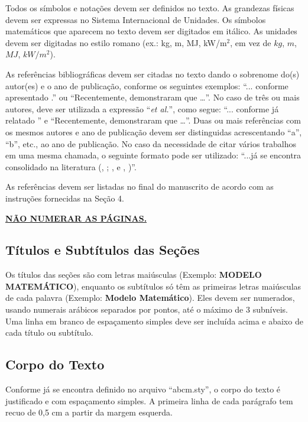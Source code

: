 \documentclass[10pt,fleqn,a4paper,twoside]{article}
\begin{document}
        Todos os símbolos e notações devem ser definidos no texto. As grandezas físicas devem ser expressas no Sistema Internacional de Unidades. Os símbolos matemáticos que aparecem no texto devem ser digitados em itálico. As unidades devem ser digitadas no estilo romano (ex.: kg, m, MJ, kW/m$^2$, em vez de $kg$, $m$, $MJ$, $kW/m^2$).
        
        As referências bibliográficas devem ser citadas no texto dando o sobrenome do(s) autor(es) e o ano de publicação, conforme os seguintes exemplos: ``... conforme apresentado \citep{MinwooShamim13}.'' ou ``Recentemente, \citet{MinwooShamim13} demonstraram que …''. No caso de três ou mais autores, deve ser utilizada a expressão ``\textit{et al.}'', como segue: ``... conforme já relatado \citep{Bordalo89}'' e ``Recentemente, \citet{Bordalo89} demonstraram que …''. Duas ou mais referências com os mesmos autores e ano de publicação devem ser distinguidas acrescentando ``a'', ``b'', etc., ao ano de publicação. No caso da necessidade de citar vários trabalhos em uma mesma chamada, o seguinte formato pode ser utilizado: ``...já se encontra consolidado na literatura (\citeauthor{Coimbra78}, \citeyear{Coimbra78}; \citeauthor{Clark86}, \citeyear{Clark86} e \citeauthor{Sparrow80},  \citeyear{Sparrow80})''.  
        
        As referências devem ser listadas no final do manuscrito de acordo com as instruções fornecidas na Seção 4.


        \textbf{\textcolor[rgb]{0.98,0.00,0.00}{\underline{NÃO NUMERAR AS PÁGINAS.}}}

    \subsection{Títulos e Subtítulos das Seções }

        Os títulos das seções são com letras maiúsculas (Exemplo: \textbf{MODELO MATEMÁTICO}), enquanto os subtítulos só têm as primeiras letras maiúsculas de cada palavra (Exemplo: \textbf{Modelo Matemático}). Eles devem ser numerados, usando numerais arábicos separados por pontos, até o máximo de 3 subníveis. Uma linha em branco de espaçamento simples deve ser incluída acima e abaixo de cada título ou subtítulo.

    \subsection{Corpo do Texto}

        Conforme já se encontra definido no arquivo ``abcm.sty'', o corpo do texto é justificado e com espaçamento simples. A primeira linha de cada parágrafo tem recuo de 0,5 cm a partir da margem esquerda.
\end{document}
